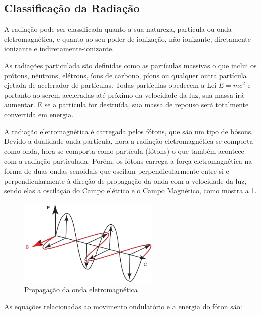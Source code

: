 \documentclass[11pt,a4paper]{article}
\begin{document}
\subsection*{Classificação da Radiação}

    A radiação pode ser classificada quanto a sua natureza, partícula ou onda eletromagnética, e quanto ao seu poder de ionização, não-ionizante, diretamente ionizante e indiretamente-ionizante.

    As radiações particulada são definidas como as partículas massivas o que inclui os prótons, nêutrons, elétrons, íons de carbono, píons ou qualquer outra partícula ejetada de acelerador de partículas. Todas partículas obedecem a Lei $E = mc^2$ e portanto ao serem aceleradas até próximo da velocidade da luz, sua massa irá aumentar. E se a partícula for destruída, sua massa de repouso será totalmente convertida em energia.

    A radiação eletromagnética é carregada pelos fótons, que são um tipo de bósons. Devido a dualidade onda-partícula, hora a radiação eletromagnética se comporta como onda, hora se comporta como partícula (fótons) o que também acontece com a radiação particulada. Porém, os fótons carrega a força eletromagnética na forma de duas ondas senoidais que oscilam perpendicularmente entre si e perpendicularmente à direção de propagação da onda com a velocidade da luz, sendo elas a oscilação do Campo elétrico e o Campo Magnético, como mostra a \ref{fig:ondaEletromagnetica}.

                    \begin{figure}[h]
                        \centering
                        \includegraphics[width=0.6\textwidth]{Imagens/ondaEletromagnetica.jpg}
                        \caption{Propagação da onda eletromagnética}
                        \label{fig:ondaEletromagnetica}
                    \end{figure}
            
As equações relacionadas ao movimento ondulatório e a energia do fóton são:
\end{document}
